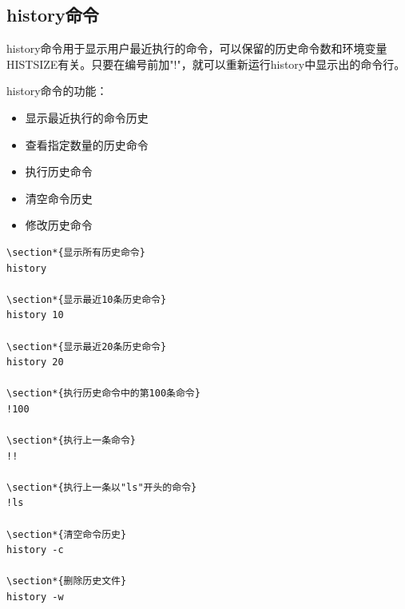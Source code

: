 \documentclass[12pt,UTF8]{ctexbook}
\begin{document}
\subsection{history命令}
history命令用于显示用户最近执行的命令，可以保留的历史命令数和环境变量HISTSIZE有关。只要在编号前加"!"，就可以重新运行history中显示出的命令行。

history命令的功能：
\begin{itemize}
    \item 显示最近执行的命令历史
    \item 查看指定数量的历史命令
    \item 执行历史命令
    \item 清空命令历史
    \item 修改历史命令
\end{itemize}

\begin{verbatim}
\section*{显示所有历史命令}
history

\section*{显示最近10条历史命令}
history 10

\section*{显示最近20条历史命令}
history 20

\section*{执行历史命令中的第100条命令}
!100

\section*{执行上一条命令}
!!

\section*{执行上一条以"ls"开头的命令}
!ls

\section*{清空命令历史}
history -c

\section*{删除历史文件}
history -w
\end{verbatim}
\end{document}
